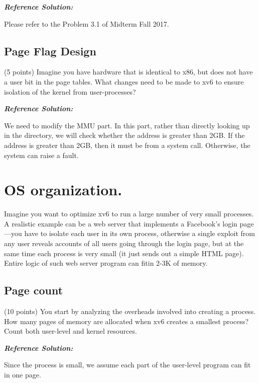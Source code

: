 \documentclass[]{article}
\begin{document}
\textbf{\emph{Reference Solution:}}

Please refer to the Problem 3.1 of Midterm Fall 2017.

\hypertarget{page-flag-design}{%
\subsection{Page Flag Design}\label{page-flag-design}}

(5 points) Imagine you have hardware that is identical to x86, but does
not have a user bit in the page tables. What changes need to be made to
xv6 to ensure isolation of the kernel from user-processes?

\textbf{\emph{Reference Solution:}}

We need to modify the MMU part. In this part, rather than directly
looking up in the directory, we will check whether the address is
greater than 2GB. If the address is greater than 2GB, then it must be
from a system call. Otherwise, the system can raise a fault.

\hypertarget{os-organization.}{%
\section{OS organization.}\label{os-organization.}}

Imagine you want to optimize xv6 to run a large number of very small
processes. A realistic example can be a web server that implements a
Facebook's login page---you have to isolate each user in its own
process, otherwise a single exploit from any user reveals accounts of
all users going through the login page, but at the same time each
process is very small (it just sends out a simple HTML page). Entire
logic of such web server program can fitin 2-3K of memory.

\hypertarget{page-count}{%
\subsection{Page count}\label{page-count}}

(10 points) You start by analyzing the overheads involved into creating
a process. How many pages of memory are allocated when xv6 creates a
smallest process? Count both user-level and kernel resources.

\textbf{\emph{Reference Solution:}}

Since the process is small, we assume each part of the user-level
program can fit in one page.
\end{document}
